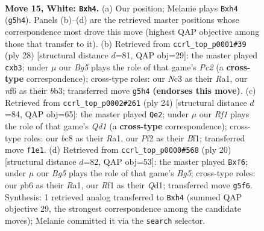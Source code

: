 \documentclass[11pt]{article}
\begin{document}
\clearpage

\begin{figure}[p]\centering
\begin{subfigure}{0.46\textwidth}\centering
\resizebox{\linewidth}{!}{%
\newchessgame
\chessboard[
  setfen={rnbqk1r1/5pb1/1p2pnp1/p5B1/P1NP3p/1BN4P/1P3PP1/R2Q1RK1 w q - 4 15},
  showmover=false,
  pgfstyle=straightmove, color=movearrow, markmove={g5-h4}
]}
\caption{}
\end{subfigure}\hfill
\begin{subfigure}{0.46\textwidth}\centering
\resizebox{\linewidth}{!}{%
\newchessgame
\chessboard[
  setfen={r3k2r/2q1bppp/pn1p1n2/4pP2/4P3/1bNBB3/1PP3PP/R2Q1RK1 w kq - 0 15},
  showmover=false,
  pgfstyle=straightmove, color=movearrow, markmove={c2-b3}
]}
\caption{}
\end{subfigure}
\\[4pt]
\begin{subfigure}{0.46\textwidth}\centering
\resizebox{\linewidth}{!}{%
\newchessgame
\chessboard[
  setfen={r2qkb1r/pb3p2/2p1pn2/1p4B1/2pP3P/2N5/PP3PP1/R2QKB1R w KQkq - 0 13},
  showmover=false,
  pgfstyle=straightmove, color=movearrow, markmove={d1-e2}
]}
\caption{}
\end{subfigure}\hfill
\begin{subfigure}{0.46\textwidth}\centering
\resizebox{\linewidth}{!}{%
\newchessgame
\chessboard[
  setfen={rnbqk2r/p3bp2/2p1pn2/1p2P1B1/2pP4/2N5/PP3PPP/R2QKB1R w KQkq - 1 11},
  showmover=false,
  pgfstyle=straightmove, color=movearrow, markmove={g5-f6}
]}
\caption{}
\end{subfigure}
\caption{\textbf{Move 15, White: \texttt{Bxh4}.} (a) Our position; Melanie plays \texttt{Bxh4} (\texttt{g5h4}). Panels (b)--(d) are the retrieved master positions whose correspondence most drove this move (highest QAP objective among those that transfer to it). (b) Retrieved from \texttt{ccrl\_top\_p0001\#39} (ply 28) [structural distance $d$=81, QAP obj=29]: the master played \texttt{cxb3}; under $\mu$ our \emph{Bg5} plays the role of that game's \emph{Pc2} (a \textbf{cross-type} correspondence); cross-type roles: our \emph{N}c3 as their \emph{R}a1, our \emph{n}f6 as their \emph{b}b3; transferred move \texttt{g5h4} \textbf{(endorses this move)}. (c) Retrieved from \texttt{ccrl\_top\_p0002\#261} (ply 24) [structural distance $d$=84, QAP obj=65]: the master played \texttt{Qe2}; under $\mu$ our \emph{Rf1} plays the role of that game's \emph{Qd1} (a \textbf{cross-type} correspondence); cross-type roles: our \emph{b}c8 as their \emph{R}a1, our \emph{P}f2 as their \emph{B}f1; transferred move \texttt{f1e1}. (d) Retrieved from \texttt{ccrl\_top\_p0000\#568} (ply 20) [structural distance $d$=82, QAP obj=53]: the master played \texttt{Bxf6}; under $\mu$ our \emph{Bg5} plays the role of that game's \emph{Bg5}; cross-type roles: our \emph{p}b6 as their \emph{R}a1, our \emph{R}f1 as their \emph{Q}d1; transferred move \texttt{g5f6}. Synthesis: 1 retrieved analog transferred to \texttt{Bxh4} (summed QAP objective 29, the strongest correspondence among the candidate moves); Melanie committed it via the \texttt{search} selector.}
\label{fig:thought-m28}
\end{figure}
\end{document}
